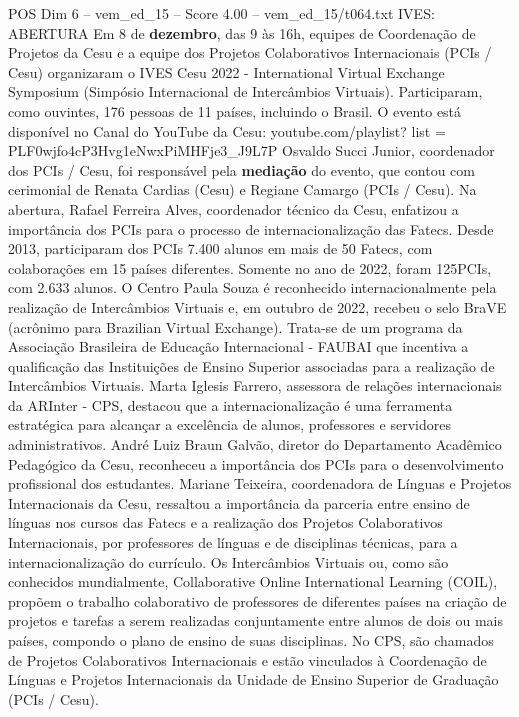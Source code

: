 \begin{textsample}{POS Dim 6 – vem\_ed\_15 – Score 4.00 – vem\_ed\_15/t064.txt}  \label{ex:f6_pos_020}
IVES: ABERTURA Em 8 de \textbf{dezembro}, das 9 às 16h, equipes de Coordenação de Projetos da Cesu e a equipe dos Projetos Colaborativos Internacionais (PCIs / Cesu) organizaram o IVES Cesu 2022 - International Virtual Exchange Symposium (Simpósio Internacional de Intercâmbios Virtuais).
Participaram, como ouvintes, 176 pessoas de 11 países, incluindo o Brasil.
O evento está disponível no Canal do YouTube da Cesu: youtube.com/playlist? list = PLF0wjfo4cP3Hvg1eNwxPiMHFje3\_J9L7P Osvaldo Succi Junior, coordenador dos PCIs / Cesu, foi responsável pela \textbf{mediação} do evento, que contou com cerimonial de Renata Cardias (Cesu) e Regiane Camargo (PCIs / Cesu).
Na abertura, Rafael Ferreira Alves, coordenador técnico da Cesu, enfatizou a importância dos PCIs para o processo de internacionalização das Fatecs.
Desde 2013, participaram dos PCIs 7.400 alunos em mais de 50 Fatecs, com colaborações em 15 países diferentes.
Somente no ano de 2022, foram 125PCIs, com 2.633 alunos.
O Centro Paula Souza é reconhecido internacionalmente pela realização de Intercâmbios Virtuais e, em outubro de 2022, recebeu o selo BraVE (acrônimo para Brazilian Virtual Exchange).
Trata-se de um programa da Associação Brasileira de Educação Internacional - FAUBAI que incentiva a qualificação das Instituições de Ensino Superior associadas para a realização de Intercâmbios Virtuais.
Marta Iglesis Farrero, assessora de relações internacionais da ARInter - CPS, destacou que a internacionalização é uma ferramenta estratégica para alcançar a excelência de alunos, professores e servidores administrativos.
André Luiz Braun Galvão, diretor do Departamento Acadêmico Pedagógico da Cesu, reconheceu a importância dos PCIs para o desenvolvimento profissional dos estudantes.
Mariane Teixeira, coordenadora de Línguas e Projetos Internacionais da Cesu, ressaltou a importância da parceria entre ensino de línguas nos cursos das Fatecs e a realização dos Projetos Colaborativos Internacionais, por professores de línguas e de disciplinas técnicas, para a internacionalização do currículo.
Os Intercâmbios Virtuais ou, como são conhecidos mundialmente, Collaborative Online International Learning (COIL), propõem o trabalho colaborativo de professores de diferentes países na criação de projetos e tarefas a serem realizadas conjuntamente entre alunos de dois ou mais países, compondo o plano de ensino de suas disciplinas.
No CPS, são chamados de Projetos Colaborativos Internacionais e estão vinculados à Coordenação de Línguas e Projetos Internacionais da Unidade de Ensino Superior de Graduação (PCIs / Cesu).

\end{textsample}
